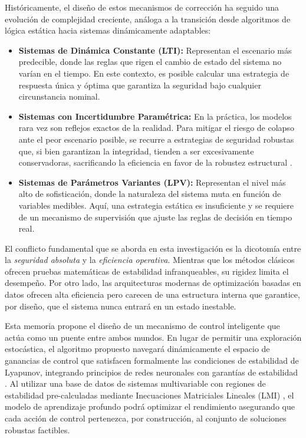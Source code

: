 \documentclass[12pt,twoside]{report}
\begin{document}
Históricamente, el diseño de estos mecanismos de corrección ha seguido una evolución de complejidad creciente, análoga a la transición desde algoritmos de lógica estática hacia sistemas dinámicamente adaptables:

\begin{itemize}
    \item \textbf{Sistemas de Dinámica Constante (LTI):} Representan el escenario más predecible, donde las reglas que rigen el cambio de estado del sistema no varían en el tiempo. En este contexto, es posible calcular una estrategia de respuesta única y óptima que garantiza la seguridad bajo cualquier circunstancia nominal.
    
    \item \textbf{Sistemas con Incertidumbre Paramétrica:} En la práctica, los modelos rara vez son reflejos exactos de la realidad. Para mitigar el riesgo de colapso ante el peor escenario posible, se recurre a estrategias de seguridad robustas que, si bien garantizan la integridad, tienden a ser excesivamente conservadoras, sacrificando la eficiencia en favor de la robustez estructural \cite{zhou1996}.
    
    \item \textbf{Sistemas de Parámetros Variantes (LPV):} Representan el nivel más alto de sofisticación, donde la naturaleza del sistema muta en función de variables medibles. Aquí, una estrategia estática es insuficiente y se requiere de un mecanismo de supervisión que ajuste las reglas de decisión en tiempo real.
\end{itemize}

El conflicto fundamental que se aborda en esta investigación es la dicotomía entre la \textit{seguridad absoluta} y la \textit{eficiencia operativa}. Mientras que los métodos clásicos ofrecen pruebas matemáticas de estabilidad infranqueables, su rigidez limita el desempeño. Por otro lado, las arquitecturas modernas de optimización basadas en datos ofrecen alta eficiencia pero carecen de una estructura interna que garantice, por diseño, que el sistema nunca entrará en un estado inestable.

Esta memoria propone el diseño de un mecanismo de control inteligente que actúa como un puente entre ambos mundos. En lugar de permitir una exploración estocástica, el algoritmo propuesto navegará dinámicamente el espacio de ganancias de control que satisfacen formalmente las condiciones de estabilidad de Lyapunov, integrando principios de redes neuronales con garantías de estabilidad \cite{manek2019}. Al utilizar una base de datos de sistemas multivariable con regiones de estabilidad pre-calculadas mediante Inecuaciones Matriciales Lineales (LMI) \cite{boyd1994}, el modelo de aprendizaje profundo podrá optimizar el rendimiento asegurando que cada acción de control pertenezca, por construcción, al conjunto de soluciones robustas factibles.
\end{document}
